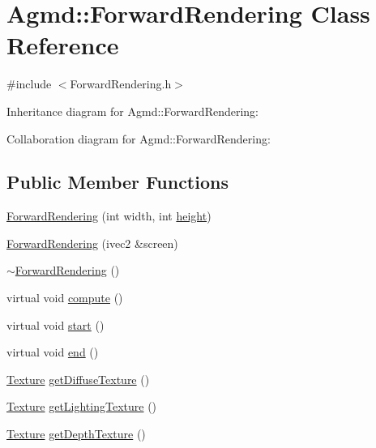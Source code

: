\hypertarget{class_agmd_1_1_forward_rendering}{\section{Agmd\+:\+:Forward\+Rendering Class Reference}
\label{class_agmd_1_1_forward_rendering}
}


{\ttfamily \#include $<$Forward\+Rendering.\+h$>$}



Inheritance diagram for Agmd\+:\+:Forward\+Rendering\+:


Collaboration diagram for Agmd\+:\+:Forward\+Rendering\+:
\subsection*{Public Member Functions}
\begin{DoxyCompactItemize}
\item 
\hyperlink{class_agmd_1_1_forward_rendering_a273553863a148fc7b5d4a47d5875a9df}{Forward\+Rendering} (int width, int \hyperlink{_examples_2_bezier_2_app_8cpp_a48083b65ac9a863566dc3e3fff09a5b4}{height})
\item 
\hyperlink{class_agmd_1_1_forward_rendering_a90e541ac43ef679bcb0da8c82cfd1c58}{Forward\+Rendering} (ivec2 \&screen)
\item 
\hyperlink{class_agmd_1_1_forward_rendering_a4325e644bafca8cc1331a193881860c3}{$\sim$\+Forward\+Rendering} ()
\item 
virtual void \hyperlink{class_agmd_1_1_forward_rendering_a439976e5f442bf382e827f786f3e34f1}{compute} ()
\item 
virtual void \hyperlink{class_agmd_1_1_forward_rendering_a2b3207d31479b4aabda32e0c7de8fc7a}{start} ()
\item 
virtual void \hyperlink{class_agmd_1_1_forward_rendering_a663d915f7286225648d33d92e9eb2d3f}{end} ()
\item 
\hyperlink{class_agmd_1_1_texture}{Texture} \hyperlink{class_agmd_1_1_forward_rendering_a1beb4b5bda961c2bf273eb08616e9118}{get\+Diffuse\+Texture} ()
\item 
\hyperlink{class_agmd_1_1_texture}{Texture} \hyperlink{class_agmd_1_1_forward_rendering_acb3da9f4502988207755f1d0e969e75c}{get\+Lighting\+Texture} ()
\item 
\hyperlink{class_agmd_1_1_texture}{Texture} \hyperlink{class_agmd_1_1_forward_rendering_a65b40a1c13c5570b7644dd11b8380bd2}{get\+Depth\+Texture} ()
\end{DoxyCompactItemize}
